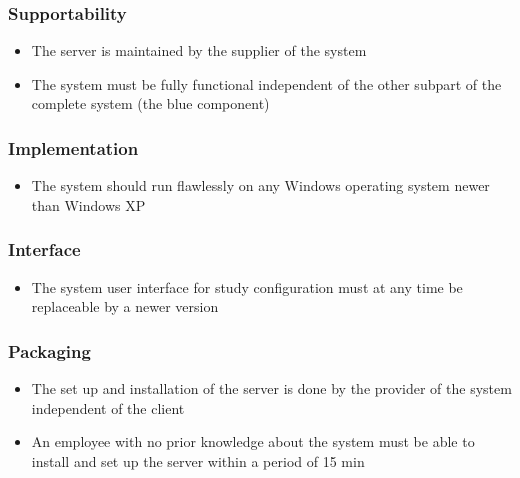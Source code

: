 \subsubsection{Supportability}

\begin{itemize}
\item The server is maintained by the supplier of the system
\item The system must be fully functional independent of the other subpart of the complete system (the blue component)
\end{itemize}

\subsubsection{Implementation}

\begin{itemize}
<<<<<<< HEAD
\item The system should run flawlessly on any Windows operating system newer than Windows XP
\end{itemize}

\subsubsection{Interface}

\begin{itemize}
\item The system user interface for study configuration must at any time be replaceable by a newer version
\end{itemize}

\subsubsection{Packaging}

\begin{itemize}
\item The set up and installation of the server is done by the provider of the system independent of the client
\item An employee with no prior knowledge about the system must be able to install and set up the server within a period of 15 min
\end{itemize}

